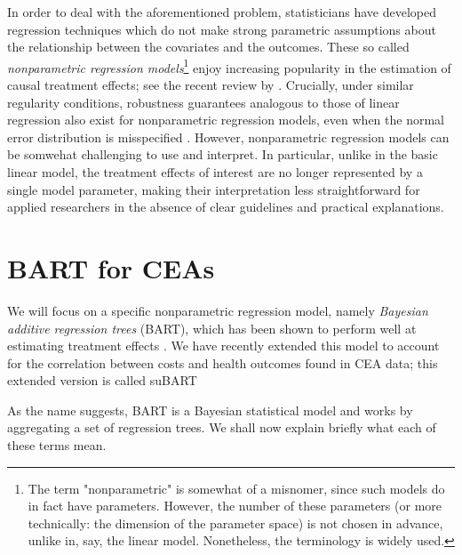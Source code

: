 \documentclass[aoas,preprint]{imsart}
\theoremstyle{plain}
\theoremstyle{definition}
\theoremstyle{remark}
\theoremstyle{remark}
\begin{document}
In order to deal with the aforementioned problem, statisticians have developed regression techniques which do not make strong parametric assumptions about the relationship between the covariates and the outcomes. These so called \emph{nonparametric regression models}\footnote{The term "nonparametric" is somewhat of a misnomer, since such models do in fact have parameters. However, the number of these parameters (or more technically: the dimension of the parameter space) is not chosen in advance, unlike in, say, the linear model. Nonetheless, the terminology is widely used.} enjoy increasing popularity in the estimation of causal treatment effects; see the recent review by \citet{caron2022estimating}. Crucially, under similar regularity conditions, robustness guarantees analogous to those of linear regression  also exist for nonparametric regression models, even when the normal error distribution is misspecified \citep{kleijn2006misspecification}.
However, nonparametric regression models can be somwehat challenging to use and interpret. In particular, unlike in the basic linear model, the treatment effects of interest are no longer represented by a single model parameter, making their interpretation less straightforward for applied researchers in the absence of clear guidelines and practical explanations.

\section{BART for CEAs}
We will focus on a specific nonparametric regression model, namely \emph{Bayesian additive regression trees} (BART), which has been shown to perform well at estimating treatment effects  \citep{dorie2019automated}. 
We have recently extended this model to account for the correlation between costs and health outcomes found in CEA data; this extended version is called suBART \citep{esser2025seemingly}

As the name suggests, BART is a Bayesian statistical model and works by aggregating a set of regression trees. We shall now explain briefly what each of these terms mean. 
\end{document}

